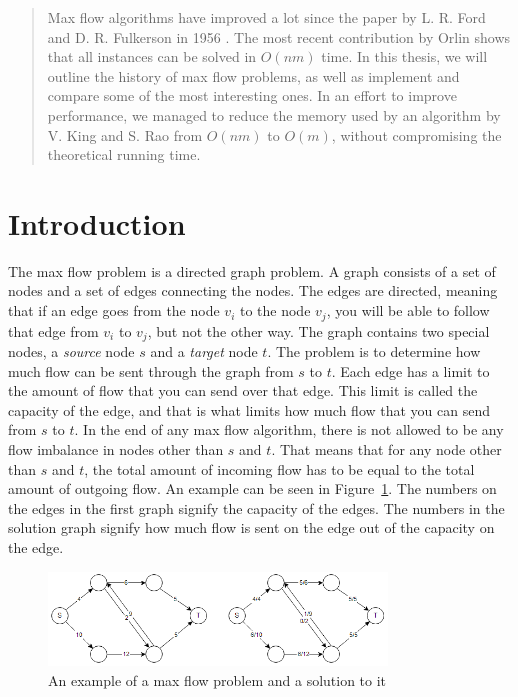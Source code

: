 \begin{abstract}
Max flow algorithms have improved a lot since the paper by L. R. Ford and D. R. Fulkerson in 1956 \cite{FordFulkerson}.
The most recent contribution by Orlin \cite{Orlin13} shows that all instances can be solved in $O(nm)$ time.
In this thesis, we will outline the history of max flow problems, as well as implement and compare some of the most interesting ones.
In an effort to improve performance, we managed to reduce the memory used by an algorithm by V. King and S. Rao \cite{King1992} from $O(nm)$ to $O(m)$, 
without compromising the theoretical running time.
\end{abstract}

\clearpage

\section{Introduction}
The max flow problem is a directed graph problem. A graph consists of a set of nodes and a set of edges connecting the nodes.
The edges are directed, meaning that if an edge goes from the node $v_i$ to the node $v_j$, you will be able to follow that edge from $v_i$ to $v_j$, but not the other way.
The graph contains two special nodes, a \emph{source} node $s$ and a \emph{target} node $t$.
The problem is to determine how much flow can be sent through the graph from $s$ to $t$.
Each edge has a limit to the amount of flow that you can send over that edge. 
This limit is called the capacity of the edge, and that is what limits how much flow that you can send from $s$ to $t$.
In the end of any max flow algorithm, there is not allowed to be any flow imbalance in nodes other than $s$ and $t$.
That means that for any node other than $s$ and $t$, the total amount of incoming flow has to be equal to the total amount of outgoing flow.
An example can be seen in Figure~\ref{maxFlowExample}. The numbers on the edges in the first graph signify the capacity of the edges.
The numbers in the solution graph signify how much flow is sent on the edge out of the capacity on the edge.
\begin{figure}[ht!]
\centering
\includegraphics[width=90mm]{MaxFlowExample.png}
\caption{An example of a max flow problem and a solution to it}
\label{maxFlowExample}
\end{figure}

